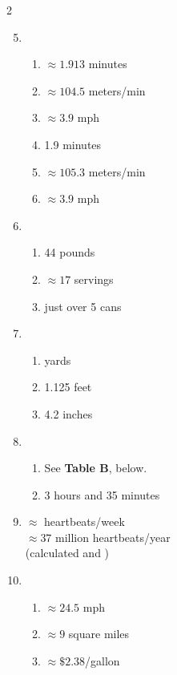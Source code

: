 \begin{multicols} {2}
\begin{enumerate}
\setcounter{enumi}{4}

\item %
\begin{enumerate}
\item $\approx 1.913$ minutes
\item $\approx 104.5$ meters/min
\item $\approx 3.9$ mph
\item 1.9 minutes
\item $\approx 105.3$ meters/min
\item $\approx 3.9$ mph
\end{enumerate}

\item \begin{enumerate}
\item 44 pounds %
\item $\approx 17$ servings %
\item just over 5 cans %
\end{enumerate}

\item \begin{enumerate}
\item {} yards %
\item 1.125 feet %
\item 4.2 inches %
\end{enumerate}

\item %
\begin{enumerate}
\item See \textbf{Table B}, below.
\item 3 hours and 35 minutes
\end{enumerate}

\item %
$\approx$  heartbeats/week \\ $\approx 37$ million heartbeats/year \\
(calculated   and )

\item %
\begin{enumerate}
\item $\approx 24.5$ mph
\item $\approx 9$ square miles
\item $\approx \$2.38$/gallon
\end{enumerate}

\end{enumerate}
\end{multicols}

